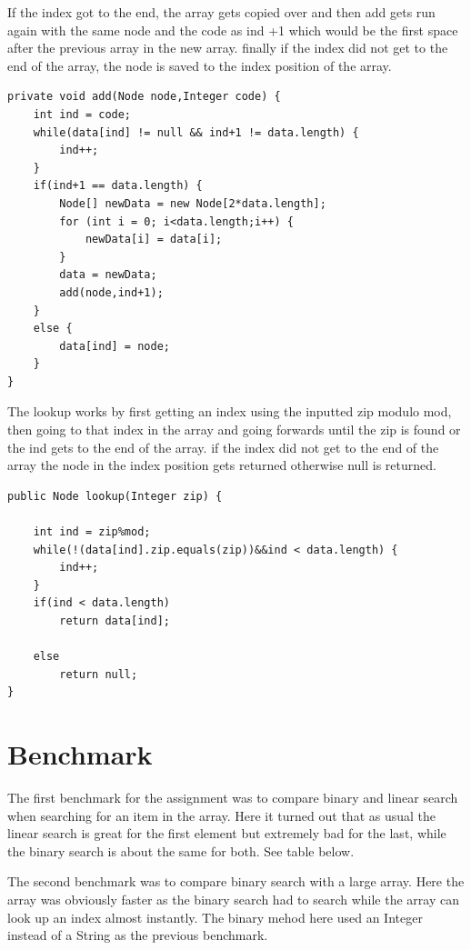 \documentclass[a4paper,11pt]{article}
\begin{document}
If the index got to the end, the array gets copied over and then add gets run again with the same node and the code as ind +1 which would be the first space after the previous array in the new array. finally if the index did not get to the end of the array, 
the node is saved to the index position of the array. 
\begin{verbatim}
private void add(Node node,Integer code) {
    int ind = code;
    while(data[ind] != null && ind+1 != data.length) {
        ind++;
    }
    if(ind+1 == data.length) {
        Node[] newData = new Node[2*data.length];
        for (int i = 0; i<data.length;i++) {
            newData[i] = data[i];
        }
        data = newData;
        add(node,ind+1);
    }
    else {
        data[ind] = node;
    }
}
\end{verbatim}
The lookup works by first getting an index using the inputted zip modulo mod, then going to that index in the array and going forwards until the zip is found or the ind gets to the end of the array.
if the index did not get to the end of the array the node in the index position gets returned otherwise null is returned.
\begin{verbatim}
public Node lookup(Integer zip) {

    int ind = zip%mod;
    while(!(data[ind].zip.equals(zip))&&ind < data.length) {
        ind++;
    }
    if(ind < data.length)
        return data[ind];
    
    else
        return null;
}    
\end{verbatim}
\section*{Benchmark}
The first benchmark for the assignment was to compare binary and linear search when searching for an item in the array.
Here it turned out that as usual the linear search is great for the first element but extremely bad for the last, while the binary search is about the same for both. See table below.
\begin{table}[h]
    \begin{center}
    \caption{Results from the benchmark of linear compared to binary when looking for zip}
    \label{tab:table1}
    \end{center}

\end{table}
\newline
\FloatBarrier{\noindent}
The second benchmark was to compare binary search with a large array. Here the array was obviously faster as the binary search had to search while the array can look up an index almost instantly. 
The binary mehod here used an Integer instead of a String as the previous benchmark.
\end{document}

